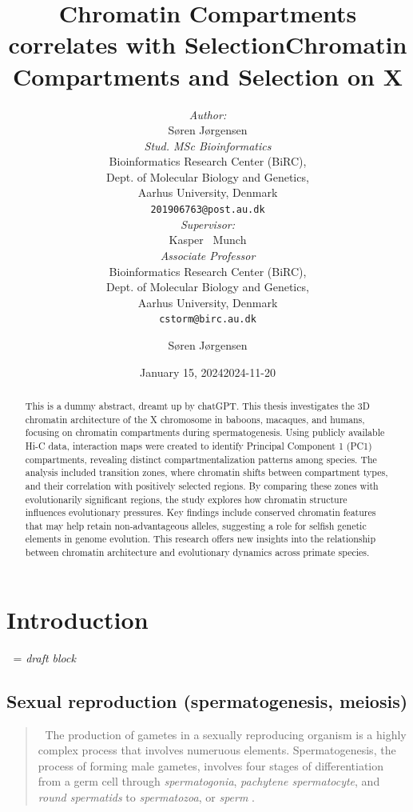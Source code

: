 \documentclass[
  a4paper,
  DIV=11,
  numbers=noendperiod]{scrartcl}
\title{Chromatin Compartments correlates with Selection}
\date{January 15, 2024}
\author{{\emph{Author:}\\
    Søren Jørgensen}	\\
    \emph{Stud. MSc Bioinformatics} \\
    Bioinformatics Research Center (BiRC),\\
    Dept. of Molecular Biology and Genetics,\\
	Aarhus University, Denmark \\
	\texttt{201906763@post.au.dk} \\
    \And
    {\emph{Supervisor:}\\
    Kasper ~Munch}	\\
    \emph{Associate Professor} \\
    Bioinformatics Research Center (BiRC),\\
    Dept. of Molecular Biology and Genetics,\\
	Aarhus University, Denmark \\
	\texttt{cstorm@birc.au.dk} \\
}
\title{Chromatin Compartments and Selection on X}
\author{Søren Jørgensen}
\date{2024-11-20}
\renewcommand*\contentsname{Table of contents}
\newcommand\contentsname{Table of contents}
\begin{document}
\maketitle
\begin{abstract}
This is a dummy abstract, dreamt up by chatGPT. This thesis investigates
the 3D chromatin architecture of the X chromosome in baboons, macaques,
and humans, focusing on chromatin compartments during spermatogenesis.
Using publicly available Hi-C data, interaction maps were created to
identify Principal Component 1 (PC1) compartments, revealing distinct
compartmentalization patterns among species. The analysis included
transition zones, where chromatin shifts between compartment types, and
their correlation with positively selected regions. By comparing these
zones with evolutionarily significant regions, the study explores how
chromatin structure influences evolutionary pressures. Key findings
include conserved chromatin features that may help retain
non-advantageous alleles, suggesting a role for selfish genetic elements
in genome evolution. This research offers new insights into the
relationship between chromatin architecture and evolutionary dynamics
across primate species.
\end{abstract}

\newpage
\tableofcontents
\newpage

\renewcommand*\contentsname{Table of contents}
{
\setcounter{tocdepth}{2}
\tableofcontents
}

\section{Introduction}\label{introduction}

{📝} = \emph{draft block}

\subsection{Sexual reproduction (spermatogenesis,
meiosis)}\label{sexual-reproduction-spermatogenesis-meiosis}

\begin{quote}
{📝} The production of gametes in a sexually reproducing organism is a
highly complex process that involves numeruous elements.
Spermatogenesis, the process of forming male gametes, involves four
stages of differentiation from a germ cell through \emph{spermatogonia},
\emph{pachytene spermatocyte}, and \emph{round spermatids} to
\emph{spermatozoa}, or \emph{sperm} \citep{wang_reprogramming_2019}.
\end{quote}
\end{document}
